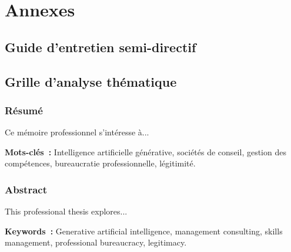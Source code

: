 \documentclass{tnreport}
\begin{document}
\part*{Annexes}

\chapter{Guide d'entretien semi-directif}

\cleardoublepage{}

\chapter{Grille d'analyse thématique}

\cleardoublepage{}

\begingroup
\renewcommand{\contentsname}{Table des matières détaillée}
\tableofcontents
\endgroup
\cleardoublepage{}

\thispagestyle{empty}

\section*{Résumé}
Ce mémoire professionnel s'intéresse à... %

\vspace{1cm}
{\bf Mots-clés~:} Intelligence artificielle générative, sociétés de conseil, gestion des compétences, bureaucratie professionnelle, légitimité.

\section*{Abstract}
This professional thesis explores... %

\vspace{1cm}
{\bf Keywords~:} Generative artificial intelligence, management consulting, skills management, professional bureaucracy, legitimacy.
\end{document}
